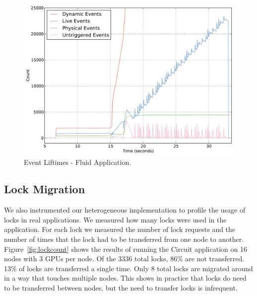 \begin{figure}
\begin{center}
\includegraphics[scale=0.33]{figs/event_lifetimes.pdf}
\end{center}
\vspace{-6mm}
\caption{Event Liftimes - Fluid Application.\label{fig:eventlife}}
\vspace{-4mm}
\end{figure}


\subsection{Lock Migration}
\label{subsec:lockmig}

We also instrumented our heterogeneous implementation to profile the usage of 
locks in real applications.  We measured how many locks were used in the application.  For
each lock we measured the number of lock requests and the number of times that the lock
had to be transferred from one node to another.  Figure~\ref{fig:lockcount} shows the results of 
running the Circuit application on 16 nodes with 3 GPUs per node.  Of the 3336 total locks,
86\% are not transferred.  13\% of locks are transferred a single time.  Only 8 total locks
are migrated around in a way that touches multiple nodes.  This shows in practice
that locks do need to be transferred between nodes, but the need to transfer locks is
infrequent.

